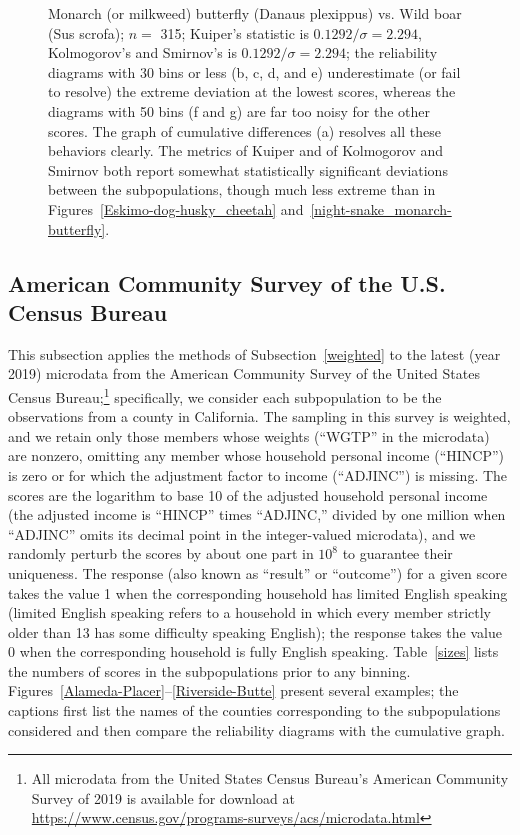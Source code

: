 \documentclass{article}
\begin{document}
\begin{figure}
\begin{centering}
\end{centering}
\caption{Monarch (or milkweed) butterfly (Danaus plexippus) vs.
         Wild boar (Sus scrofa); $n =$ 315;
         Kuiper's statistic is $0.1292 / \sigma = 2.294$,
         Kolmogorov's and Smirnov's is $0.1292 / \sigma = 2.294$;
         the reliability diagrams with 30 bins or less (b, c, d, and e)
         underestimate (or fail to resolve) the extreme deviation
         at the lowest scores, whereas the diagrams with 50 bins (f and g)
         are far too noisy for the other scores.
         The graph of cumulative differences (a) resolves
         all these behaviors clearly.
         The metrics of Kuiper and of Kolmogorov and Smirnov both report
         somewhat statistically significant deviations
         between the subpopulations, though much less extreme than in
         Figures~\ref{Eskimo-dog-husky_cheetah}
         and~\ref{night-snake_monarch-butterfly}.
}
\label{monarch-butterfly_wild-boar}
\end{figure}



\subsection{American Community Survey of the U.S. Census Bureau}
\label{census}

This subsection applies the methods of Subsection~\ref{weighted}
to the latest (year 2019) microdata from the American Community Survey
of the United States Census Bureau;\footnote{All microdata
from the United States Census Bureau's American Community Survey of 2019
is available for download at
\url{https://www.census.gov/programs-surveys/acs/microdata.html}}
specifically, we consider each subpopulation to be the observations
from a county in California. The sampling in this survey is weighted,
and we retain only those members whose weights (``WGTP'' in the microdata)
are nonzero, omitting any member whose household personal income
(``HINCP'') is zero or for which the adjustment factor to income (``ADJINC'')
is missing. The scores are the logarithm to base 10
of the adjusted household personal income
(the adjusted income is ``HINCP'' times ``ADJINC,'' divided by one million
when ``ADJINC'' omits its decimal point in the integer-valued microdata),
and we randomly perturb the scores by about one part in $10^8$ to guarantee
their uniqueness.
The response (also known as ``result'' or ``outcome'') for a given score
takes the value 1 when the corresponding household has limited English speaking
(limited English speaking refers to a household in which every member
strictly older than 13 has some difficulty speaking English);
the response takes the value 0
when the corresponding household is fully English speaking.
Table~\ref{sizes} lists the numbers of scores in the subpopulations
prior to any binning.
Figures~\ref{Alameda-Placer}--\ref{Riverside-Butte} present several examples;
the captions first list the names of the counties corresponding
to the subpopulations considered and then compare the reliability diagrams
with the cumulative graph.
\end{document}
